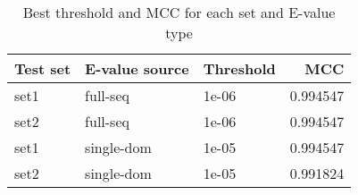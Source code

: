 \documentclass{article}
\begin{document}
\begin{table}[htbp]
\centering
\caption{Best threshold and MCC for each set and E-value type}
\label{tab:best_thresholds}
\begin{tabular}{lllr}
\toprule
Test set & E-value source & Threshold & MCC \\
\midrule
set1 & full-seq & 1e-06 & 0.994547 \\
set2 & full-seq & 1e-06 & 0.994547 \\
set1 & single-dom & 1e-05 & 0.994547 \\
set2 & single-dom & 1e-05 & 0.991824 \\
\bottomrule
\end{tabular}
\end{table}
\end{document}
